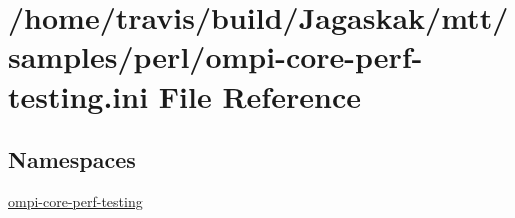 \hypertarget{ompi-core-perf-testing_8ini}{\section{/home/travis/build/\-Jagaskak/mtt/samples/perl/ompi-\/core-\/perf-\/testing.ini File Reference}
\label{ompi-core-perf-testing_8ini}
}
\subsection*{Namespaces}
\begin{DoxyCompactItemize}
\item 
\hyperlink{namespaceompi-core-perf-testing}{ompi-\/core-\/perf-\/testing}
\end{DoxyCompactItemize}

